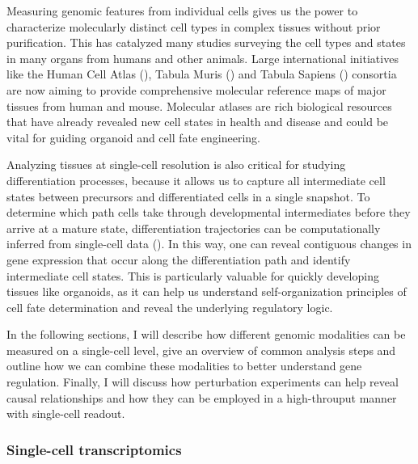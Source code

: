 Measuring genomic features from individual cells gives us the power to characterize molecularly distinct cell types in complex tissues without prior purification. This has catalyzed many studies surveying the cell types and states in many organs from humans and other animals. Large international initiatives like the Human Cell Atlas (\cite{regev_human_2017}), Tabula Muris (\cite{the_tabula_muris_consortium_single-cell_2020}) and Tabula Sapiens (\cite{the_tabula_sapiens_consortium_tabula_2022}) consortia are now aiming to provide comprehensive molecular reference maps of major tissues from human and mouse. Molecular atlases are rich biological resources that have already revealed new cell states in health and disease and could be vital for guiding organoid and cell fate engineering. 

Analyzing tissues at single-cell resolution is also critical for studying differentiation processes, because it allows us to capture all intermediate cell states between precursors and differentiated cells in a single snapshot. To determine which path cells take through developmental intermediates before they arrive at a mature state, differentiation trajectories can be computationally inferred from single-cell data (\cite{trapnell_dynamics_2014,lange_cellrank_2022}). In this way, one can reveal contiguous changes in gene expression that occur along the differentiation path and identify intermediate cell states. This is particularly valuable for quickly developing tissues like organoids, as it can help us understand self-organization principles of cell fate determination and reveal the underlying regulatory logic. 

In the following sections, I will describe how different genomic modalities can be measured on a single-cell level, give an overview of common analysis steps and outline how we can combine these modalities to better understand gene regulation. Finally, I will discuss how perturbation experiments can help reveal causal relationships and how they can be employed in a high-throuput manner with single-cell readout.




\subsubsection{Single-cell transcriptomics}


